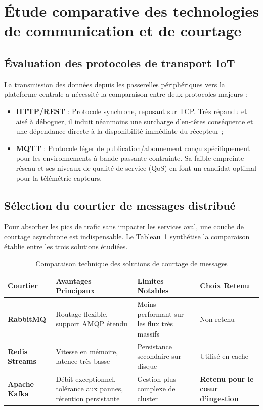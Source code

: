 \section{\'Etude comparative des technologies de communication et de courtage}
\subsection{\'Evaluation des protocoles de transport IoT}
La transmission des donn\'ees depuis les passerelles p\'eriph\'eriques vers la plateforme centrale a n\'ecessit\'e la comparaison entre deux protocoles majeurs :
\begin{itemize}
    \item \textbf{HTTP/REST} : Protocole synchrone, reposant sur TCP. Tr\`es r\'epandu et ais\'e \`a d\'eboguer, il induit n\'eanmoins une surcharge d'en-t\^etes cons\'equente et une d\'ependance directe \`a la disponibilit\'e imm\'ediate du r\'ecepteur ;
    \item \textbf{MQTT} : Protocole l\'eger de publication/abonnement con\c{c}u sp\'ecifiquement pour les environnements \`a bande passante contrainte. Sa faible empreinte r\'eseau et ses niveaux de qualit\'e de service (QoS) en font un candidat optimal pour la t\'el\'em\'etrie capteurs.
\end{itemize}

\subsection{S\'election du courtier de messages distribu\'e}
Pour absorber les pics de trafic sans impacter les services aval, une couche de courtage asynchrone est indispensable. Le Tableau~\ref{tab:synthese-technologies} synth\'etise la comparaison \'etablie entre les trois solutions \'etudi\'ees.

\begin{table}[H]
\centering
\begin{tabularx}{\textwidth}{p{3.2cm} X X p{3.2cm}}
\toprule
\textbf{Courtier} & \textbf{Avantages Principaux} & \textbf{Limites Notables} & \textbf{Choix Retenu} \\
\midrule
\textbf{RabbitMQ} & Routage flexible, support AMQP \'etendu & Moins performant sur les flux tr\`es massifs & Non retenu \\
\textbf{Redis Streams} & Vitesse en m\'emoire, latence tr\`es basse & Persistance secondaire sur disque & Utilis\'e en cache \\
\textbf{Apache Kafka} & D\'ebit exceptionnel, tol\'erance aux pannes, r\'etention persistante & Gestion plus complexe de cluster & \textbf{Retenu pour le c\oe ur d'ingestion} \\
\bottomrule
\end{tabularx}
\caption{Comparaison technique des solutions de courtage de messages}
\label{tab:synthese-technologies}
\end{table}

